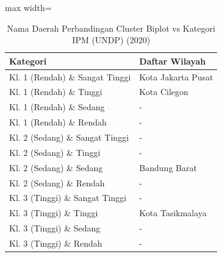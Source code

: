 \begin{table}[H]
\centering
\caption{Nama Daerah Perbandingan Cluster Biplot vs Kategori IPM (UNDP) (2020)} \label{tab:samplecrossname2020}
\begin{adjustbox}{max width=\textwidth}
\begin{tabular}{|p{4cm}|p{10cm}|}
\hline
\textbf{Kategori} & \textbf{Daftar Wilayah} \\
\hline
Kl. 1 (Rendah) \& Sangat Tinggi & Kota Jakarta Pusat \\
\hline
Kl. 1 (Rendah) \& Tinggi & Kota Cilegon \\
\hline
Kl. 1 (Rendah) \& Sedang & - \\
\hline
Kl. 1 (Rendah) \& Rendah & - \\
\hline
Kl. 2 (Sedang) \& Sangat Tinggi & - \\
\hline
Kl. 2 (Sedang) \& Tinggi & - \\
\hline
Kl. 2 (Sedang) \& Sedang & Bandung Barat \\
\hline
Kl. 2 (Sedang) \& Rendah & - \\
\hline
Kl. 3 (Tinggi) \& Sangat Tinggi & - \\
\hline
Kl. 3 (Tinggi) \& Tinggi & Kota Tasikmalaya \\
\hline
Kl. 3 (Tinggi) \& Sedang & - \\
\hline
Kl. 3 (Tinggi) \& Rendah & - \\
\hline
\end{tabular}
\end{adjustbox}
\end{table}